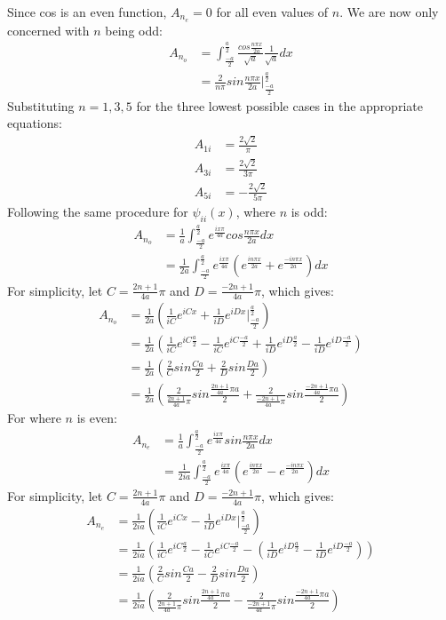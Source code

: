 \documentclass{article}
\numberwithin{equation}{section}
\begin{document}
Since cos is an even function, $A_{n_e}=0$ for all even values of $n$. We are now only concerned with $n$ being odd:
\begin{align*}
	A_{n_o}&=\int_{\frac{-a}{2}}^{\frac{a}{2}} \frac{cos\frac{n \pi x}{2a}}{\sqrt{a}}\frac{1}{\sqrt{a}} dx
\\   &=\frac{2}{n\pi}sin\frac{n \pi x}{2a}|_{\frac{-a}{2}}^{\frac{a}{2}} 
\end{align*}
Substituting $n=1,3,5$ for the three lowest possible cases in the appropriate equations:
\begin{align*}
	A_{1i}&=\frac{2\sqrt{2}}{ \pi}
\\	A_{3i}&=\frac{2\sqrt{2}}{3 \pi}
\\      A_{5i}&=-\frac{2\sqrt{2}}{5 \pi}
\end{align*}
Following the same procedure for $\psi_{ii}(x)$, where $n$ is odd:
\begin{align*}
	A_{n_o}&=\frac{1}{a}\int_{\frac{-a}{2}}^{\frac{a}{2}} e^{\frac{ix\pi}{4a}}cos\frac{n \pi x}{2a}dx
\\   &=\frac{1}{2a}\int_{\frac{-a}{2}}^{\frac{a}{2}} e^{\frac{ix\pi}{4a}}(e^{\frac{in\pi x}{2a}}+e^{\frac{-in\pi x}{2a}})dx
\end{align*}
For simplicity, let $C=\frac{2n+1}{4a}\pi$ and $D=\frac{-2n+1}{4a}\pi$, which gives:
\begin{align*}
	A_{n_o}&=\frac{1}{2a}(\frac{1}{iC}e^{iCx}+\frac{1}{iD}e^{iDx}|_{\frac{-a}{2}}^{\frac{a}{2}}) 
\\             &=\frac{1}{2a}(\frac{1}{iC}e^{iC\frac{a}{2}}-\frac{1}{iC}e^{iC\frac{-a}{2}}+\frac{1}{iD}e^{iD\frac{a}{2}}-\frac{1}{iD}e^{iD\frac{-a}{2}})
\\   &=\frac{1}{2a}(\frac{2}{C}sin\frac{Ca}{2}+\frac{2}{D}sin\frac{Da}{2})
\\   &=\frac{1}{2a}(\frac{2}{\frac{2n+1}{4a}\pi}sin\frac{\frac{2n+1}{4a}\pi a}{2}+\frac{2}{\frac{-2n+1}{4a}\pi}sin\frac{\frac{-2n+1}{4a}\pi a}{2})
\end{align*}
For where $n$ is even:
\begin{align*}
	A_{n_e}&=\frac{1}{a}\int_{\frac{-a}{2}}^{\frac{a}{2}} e^{\frac{ix\pi}{4a}}sin\frac{n \pi x}{2a}dx
\\   &=\frac{1}{2ia}\int_{\frac{-a}{2}}^{\frac{a}{2}} e^{\frac{ix\pi}{4a}}(e^{\frac{in\pi x}{2a}}-e^{\frac{-in\pi x}{2a}})dx
\end{align*}
For simplicity, let $C=\frac{2n+1}{4a}\pi$ and $D=\frac{-2n+1}{4a}\pi$, which gives:
\begin{align*}
	A_{n_e}&=\frac{1}{2ia}(\frac{1}{iC}e^{iCx}-\frac{1}{iD}e^{iDx}|_{\frac{-a}{2}}^{\frac{a}{2}}) 
\\             &=\frac{1}{2ia}(\frac{1}{iC}e^{iC\frac{a}{2}}-\frac{1}{iC}e^{iC\frac{-a}{2}}-(\frac{1}{iD}e^{iD\frac{a}{2}}-\frac{1}{iD}e^{iD\frac{-a}{2}}))
\\   &=\frac{1}{2ia}(\frac{2}{C}sin\frac{Ca}{2}-\frac{2}{D}sin\frac{Da}{2})
\\   &=\frac{1}{2ia}(\frac{2}{\frac{2n+1}{4a}\pi}sin\frac{\frac{2n+1}{4a}\pi a}{2}-\frac{2}{\frac{-2n+1}{4a}\pi}sin\frac{\frac{-2n+1}{4a}\pi a}{2})
\end{align*}
\end{document}
